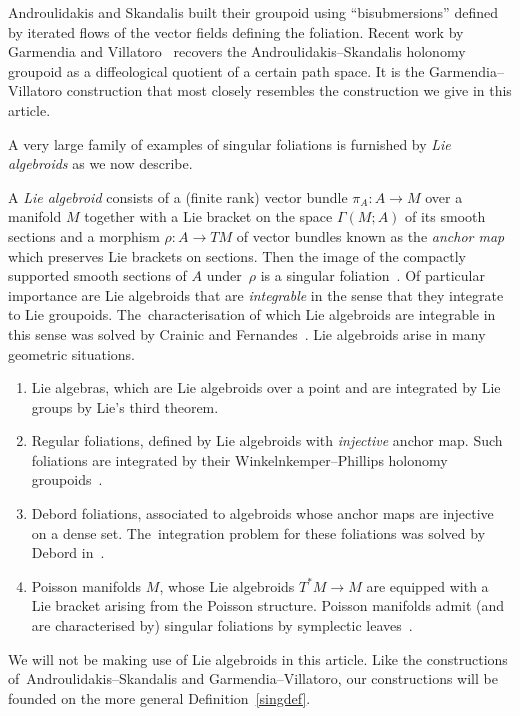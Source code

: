 \documentclass[pdftex]{sigma}
\numberwithin{equation}{section}
\begin{document}
Androulidakis and Skandalis built their groupoid using ``bisubmersions'' defined by iterated flows of the vector fields defining the foliation. Recent work by Garmendia and Villatoro~\cite{VilGar1} recovers the Androulidakis--Skandalis holonomy groupoid as a diffeological quotient of a certain path space. It is the Garmendia--Villatoro construction that most closely resembles the construction we give in this article.

A very large family of examples of singular foliations is furnished by \textit{Lie algebroids} as we now describe.

\begin{Example}%
A \textit{Lie algebroid} consists of a (finite rank) vector bundle $\pi_{A}\colon A\rightarrow M$ over a manifold $M$ together with a Lie bracket on the space $\Gamma(M;A)$ of its smooth sections and a morphism $\rho\colon A\rightarrow TM$ of vector bundles known as the \textit{anchor map} which preserves Lie brackets on sections. Then the image of the compactly supported smooth sections of $A$ under~$\rho$ is a singular foliation~\cite[Example 1.3]{iakovos2}. Of particular importance are Lie algebroids that are \textit{integrable} in the sense that they integrate to Lie groupoids. The~characterisation of which Lie algebroids are integrable in this sense was solved by Crainic and Fernandes~\cite{cf2}. Lie algebroids arise in many geometric situations.
\begin{enumerate}\itemsep=0pt
\item Lie algebras, which are Lie algebroids over a point and are integrated by Lie groups by Lie's third theorem.
\item Regular foliations, defined by Lie algebroids with \textit{injective} anchor map. Such foliations are integrated by their Winkelnkemper--Phillips holonomy groupoids~\cite{holimper,wink}.
\item Debord foliations, associated to algebroids whose anchor maps are injective on a dense set. The~integration problem for these foliations was solved by Debord in~\cite{debord, debord2}.
\item Poisson manifolds $M$, whose Lie algebroids $T^{*}M\rightarrow M$ are equipped with a Lie bracket arising from the Poisson structure. Poisson manifolds admit (and are characterised by) singular foliations by symplectic leaves~\cite[p.~113]{cf2}.
\end{enumerate}
\end{Example}

We will not be making use of Lie algebroids in this article. Like the constructions of~And\-rou\-lidakis--Skandalis and Garmendia--Villatoro, our constructions will be founded on the more general Definition~\ref{singdef}.
\end{document}
